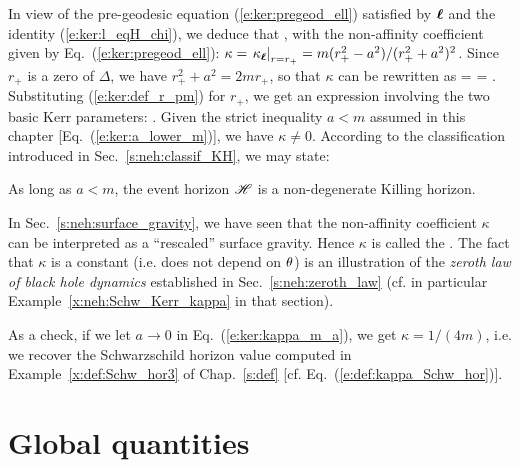 In view of the pre-geodesic equation (\ref{e:ker:pregeod_ell}) satisfied
by $\bm{\ell}$ and the identity (\ref{e:ker:l_eqH_chi}), we deduce that
\be \label{e:ker:pregeod_chi}
    \encadre{ \wnab_{\w{\chi}}\, \w{\chi} \equalH \kappa \, \w{\chi} },
\ee
with the non-affinity coefficient given by Eq.~(\ref{e:ker:pregeod_ell}):
$\kappa = \left. \kappa_{\bm{\ell}} \right| _{r=r_+} = m(r_+^2-a^2)/(r_+^2+a^2)^2$.
Since $r_+$ is a zero of $\Delta$, we have $r_+^2 + a^2 = 2 m r_+$, so that
$\kappa$ can be rewritten as
\be \label{e:ker:kappa_rp_m_a}
    \kappa =  =  .
\ee
Substituting (\ref{e:ker:def_r_pm}) for $r_+$, we get an expression involving
the two basic Kerr parameters:
\be \label{e:ker:kappa_m_a}
     .
\ee
Given the strict inequality $a<m$ assumed in this chapter [Eq.~(\ref{e:ker:a_lower_m})],
we have $\kappa\not=0$. According to the classification introduced in
Sec.~\ref{s:neh:classif_KH}, we may state:
\begin{prop}
As long as $a<m$, the event horizon $\mathscr{H}$ is a non-degenerate Killing horizon.
\end{prop}
In Sec.~\ref{s:neh:surface_gravity}, we have seen that the non-affinity coefficient
$\kappa$ can be interpreted as a ``rescaled'' surface gravity. Hence $\kappa$
is called
the .
The fact that $\kappa$ is a constant (i.e. does not depend on $\theta$) is
an illustration of the \emph{zeroth law of black hole dynamics}
established in Sec.~\ref{s:neh:zeroth_law} (cf. in particular
Example~\ref{x:neh:Schw_Kerr_kappa} in that section).
\begin{remark}
As a check, if we let $a\rightarrow 0$ in Eq.~(\ref{e:ker:kappa_m_a}), we get
$\kappa = 1/(4m)$, i.e. we recover the Schwarzschild horizon value computed in
Example~\ref{x:def:Schw_hor3} of Chap.~\ref{s:def} [cf. Eq.~(\ref{e:def:kappa_Schw_hor})].
\end{remark}



\section{Global quantities} \label{s:ker:global_quantities}

